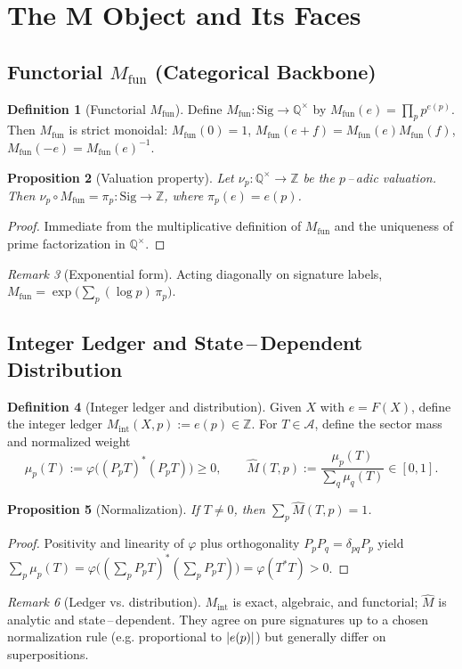 \documentclass[11pt]{article}
\theoremstyle{definition}
\newtheorem{definition}{Definition}[section]
\theoremstyle{plain}
\newtheorem{proposition}[definition]{Proposition}
\theoremstyle{remark}
\newtheorem{remark}[definition]{Remark}
\newcommand{\Sig}{\mathrm{Sig}}
\newcommand{\A}{\mathcal{A}}
\newcommand{\Qbb}{\mathbb{Q}}
\newcommand{\Zbb}{\mathbb{Z}}
\newcommand{\Mfun}{M_{\mathrm{fun}}}
\newcommand{\Mint}{M_{\mathrm{int}}}
\newcommand{\Mhat}{\widehat{M}}
\DeclarePairedDelimiter{\abs}{\lvert}{\rvert}
\begin{document}
\section{The $\mathbf M$ Object and Its Faces}
\subsection{Functorial $\Mfun$ (Categorical Backbone)}
\begin{definition}[Functorial $\Mfun$]\label{def:Mfun}
Define $\Mfun: \Sig\to \Qbb^{\times}$ by $\Mfun(e)=\prod_p p^{e(p)}$. Then $\Mfun$ is strict monoidal: $\Mfun(0)=1$, $\Mfun(e+f)=\Mfun(e)\Mfun(f)$, $\Mfun(-e)=\Mfun(e)^{-1}$.
\end{definition}
\begin{proposition}[Valuation property]\label{prop:valuation}
Let $\nu_p: \Qbb^{\times}\to\Zbb$ be the $p$\,–\,adic valuation. Then $\nu_p\circ \Mfun=\pi_p: \Sig\to\Zbb$, where $\pi_p(e)=e(p)$.
\end{proposition}
\begin{proof} Immediate from the multiplicative definition of $\Mfun$ and the uniqueness of prime factorization in $\Qbb^{\times}$.\end{proof}
\begin{remark}[Exponential form]
Acting diagonally on signature labels, $\Mfun=\exp\big(\sum_p (\log p)\,\pi_p\big)$.
\end{remark}

\subsection{Integer Ledger and State\,–\,Dependent Distribution}
\begin{definition}[Integer ledger and distribution]\label{def:ledger-dist}
Given $X$ with $e=F(X)$, define the integer ledger $\Mint(X,p):=e(p)\in\Zbb$. For $T\in\A$, define the sector mass and normalized weight
\begin{equation}\label{eq:sector-weight}
\mu_p(T):=\varphi\big((P_pT)^{*}(P_pT)\big)\ge 0,\qquad \Mhat(T,p):=\frac{\mu_p(T)}{\sum_q\mu_q(T)}\in[0,1].
\end{equation}
\end{definition}
\begin{proposition}[Normalization]\label{prop:normalization}
If $T\neq 0$, then $\sum_p \Mhat(T,p)=1$.
\end{proposition}
\begin{proof} Positivity and linearity of $\varphi$ plus orthogonality $P_pP_q=\delta_{pq}P_p$ yield $\sum_p\mu_p(T)=\varphi\big((\sum_p P_pT)^*(\sum_p P_pT)\big)=\varphi(T^*T)>0$.\end{proof}
\begin{remark}[Ledger vs. distribution]
$\Mint$ is exact, algebraic, and functorial; $\Mhat$ is analytic and state\,–\,dependent. They agree on pure signatures up to a chosen normalization rule (e.g. proportional to $\abs{e(p)}$) but generally differ on superpositions.
\end{remark}
\end{document}

